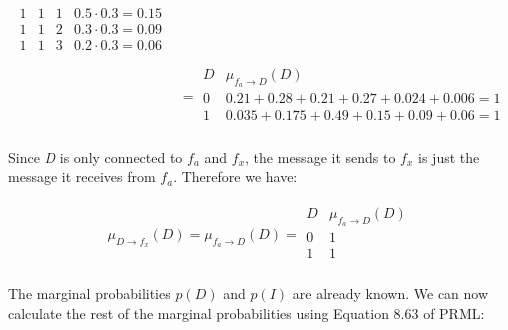 \documentclass[a4paper, 12pt]{article}
\begin{document}
\begin{align}
\begin{array}{ccc|c}
		1 & 1 & 1 & 0.5 \cdot 0.3 = 0.15\\
		1 & 1 & 2 & 0.3 \cdot 0.3 = 0.09\\
		1 & 1 & 3 & 0.2 \cdot 0.3 = 0.06\\
	\end{array}\\
	&= \begin{array}{c|c}
		D & \mu_{f_a \to D}(D)\\
		\hline
		0 & 0.21 + 0.28 + 0.21 + 0.27 + 0.024 + 0.006 = 1\\
		1 & 0.035 + 0.175 + 0.49 + 0.15 + 0.09 + 0.06 = 1\\
	\end{array}
\end{align}

Since \textit{D} is only connected to $f_a$ and $f_x$, the message it sends to $f_x$ is just the message it receives from $f_a$. Therefore we have:

\begin{align}
	\mu_{D \to f_x}(D) = \mu_{f_a \to D}(D) = \begin{array}{c|c}
		D & \mu_{f_a \to D}(D)\\
		\hline
		0 & 1\\
		1 & 1\\
	\end{array}
\end{align}

The marginal probabilities $p(D)$ and $p(I)$ are already known. We can now calculate the rest of the marginal probabilities using Equation 8.63 of PRML:
\end{document}
